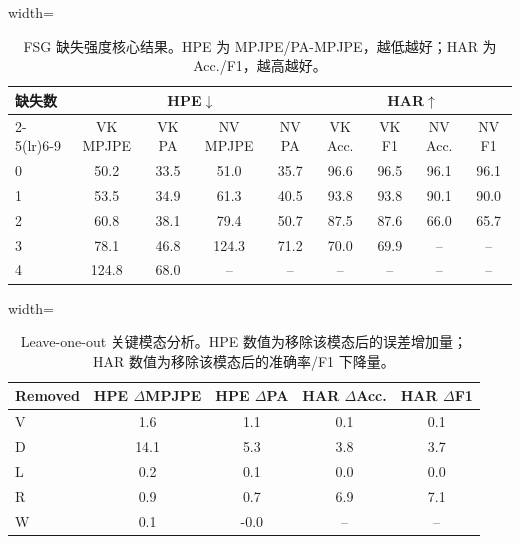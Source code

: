 \begin{table}[t]
\centering
\caption{FSG 缺失强度核心结果。HPE 为 MPJPE/PA-MPJPE，越低越好；HAR 为 Acc./F1，越高越好。}
\label{tab:severity_cn}
\scriptsize
\begin{adjustbox}{width=\textwidth}
\begin{tabular}{lcccccccc}
\toprule
\multirow{2}{*}{缺失数} & \multicolumn{4}{c}{HPE$\downarrow$} & \multicolumn{4}{c}{HAR$\uparrow$} \\
\cmidrule(lr){2-5}\cmidrule(lr){6-9}
 & VK MPJPE & VK PA & NV MPJPE & NV PA & VK Acc. & VK F1 & NV Acc. & NV F1 \\
\midrule
0 & 50.2 & 33.5 & 51.0 & 35.7 & 96.6 & 96.5 & 96.1 & 96.1 \\
1 & 53.5 & 34.9 & 61.3 & 40.5 & 93.8 & 93.8 & 90.1 & 90.0 \\
2 & 60.8 & 38.1 & 79.4 & 50.7 & 87.5 & 87.6 & 66.0 & 65.7 \\
3 & 78.1 & 46.8 & 124.3 & 71.2 & 70.0 & 69.9 & -- & -- \\
4 & 124.8 & 68.0 & -- & -- & -- & -- & -- & -- \\
\bottomrule
\end{tabular}
\end{adjustbox}
\end{table}


\begin{table}[H]
\centering
\caption{Leave-one-out 关键模态分析。HPE 数值为移除该模态后的误差增加量；HAR 数值为移除该模态后的准确率/F1 下降量。}
\label{tab:loo_cn}
\scriptsize
\begin{adjustbox}{width=\linewidth}
\begin{tabular}{lcccc}
\toprule
Removed & HPE $\Delta$MPJPE & HPE $\Delta$PA & HAR $\Delta$Acc. & HAR $\Delta$F1 \\
\midrule
V & 1.6 & 1.1 & 0.1 & 0.1 \\
D & 14.1 & 5.3 & 3.8 & 3.7 \\
L & 0.2 & 0.1 & 0.0 & 0.0 \\
R & 0.9 & 0.7 & 6.9 & 7.1 \\
W & 0.1 & -0.0 & -- & -- \\
\bottomrule
\end{tabular}
\end{adjustbox}
\end{table}


